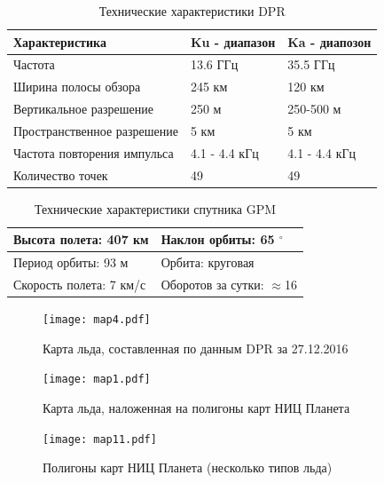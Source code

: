 \begin{table}[h!]
  \centering
  \caption{Технические характеристики DPR}
  \vspace{10 pt}
  \begin{tabular}{l|l|l}
   Характеристика & Ku - диапазон & Ka - диапозон \\ \hline
   Частота & 13.6 ГГц & 35.5 ГГц \\ \hline
   Ширина полосы обзора & 245 км & 120 км \\\hline
   Вертикальное разрешение & 250 м & 250-500 м \\\hline
   Пространственное разрешение & 5 км & 5 км \\\hline
   Частота повторения импульса & 4.1 - 4.4 кГц & 4.1 - 4.4 кГц \\\hline
   Количество точек & 49 & 49 
   \end{tabular}
  
  \label{tab:1}
\end{table}

\begin{table}[h!]
  \centering
  \caption{Технические характеристики спутника GPM}
  \vspace{10 pt}
  \begin{tabular}{l|l}
   Высота полета: 407 км & Наклон орбиты: 65 $^{\circ}$\\ \hline
     Период орбиты: 93 м & Орбита: круговая \\ \hline
     Скорость полета: 7 км/с & Оборотов за сутки: $\approx$16
  \end{tabular}
  
  \label{tab:1}
\end{table}


\begin{figure}[h!]
  \centering
  \texttt{[image: map4.pdf]}
  \caption{Карта льда, составленная по данным DPR за 27.12.2016}
  \label{fig:15}
\end{figure}

\begin{figure}[h!]
  \centering
  \begin{minipage}{0.49\linewidth}
    \texttt{[image: map1.pdf]}
    \caption{Карта льда, наложенная на полигоны карт НИЦ Планета}
    \label{fig:13}
  \end{minipage}
  \begin{minipage}{0.49\linewidth}
    \texttt{[image: map11.pdf]}
    \caption{Полигоны карт НИЦ Планета (несколько типов льда)}
    \label{fig:14}
  \end{minipage}

\end{figure}




